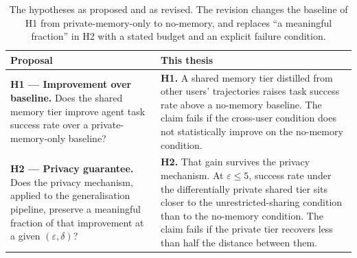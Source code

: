 \begin{table}[t]
\centering
\small
\begin{tabularx}{\textwidth}{@{}XX@{}}
\toprule
\textbf{Proposal} & \textbf{This thesis} \\
\midrule
\textbf{H1 — Improvement over baseline.} Does the shared memory tier improve agent task success rate over a private-memory-only baseline? &
\textbf{H1.} A shared memory tier distilled from other users' trajectories raises task success rate above a no-memory baseline. The claim fails if the cross-user condition does not statistically improve on the no-memory condition. \\
\addlinespace
\textbf{H2 — Privacy guarantee.} Does the \citet{amin2024private} privacy mechanism, applied to the generalisation pipeline, preserve a meaningful fraction of that improvement at a given $(\varepsilon, \delta)$? &
\textbf{H2.} That gain survives the privacy mechanism. At $\varepsilon \leq 5$, success rate under the differentially private shared tier sits closer to the unrestricted-sharing condition than to the no-memory condition. The claim fails if the private tier recovers less than half the distance between them. \\
\bottomrule
\end{tabularx}
\caption{The hypotheses as proposed and as revised. The revision changes the baseline of H1 from private-memory-only to no-memory, and replaces ``a meaningful fraction'' in H2 with a stated budget and an explicit failure condition.}
\label{tab:hypotheses-revision}
\end{table}

